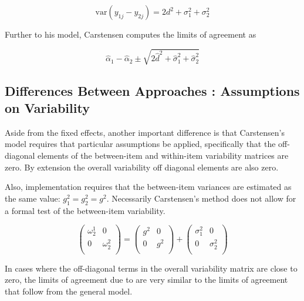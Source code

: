 \documentclass[12pt, a4paper]{report}
\theoremstyle{plain}
\theoremstyle{definition}
\theoremstyle{remark}
\begin{document}
	\[ \mbox{var}(y_{1j} - y_{2j}) = 2d^2 + \sigma^2_1 + \sigma^2_2  \]
	
	Further to his model, Carstensen computes the limits of agreement
	as
	
	\[
	\hat{\alpha}_1 - \hat{\alpha}_2 \pm \sqrt{2 \hat{d}^2 + 	\hat{\sigma}^2_1 + \hat{\sigma}^2_2}
	\]
	
	




	\subsection{Differences Between Approaches : Assumptions on Variability}
	Aside from the fixed effects, another important difference is that Carstensen's model requires that particular assumptions be applied, specifically that the off-diagonal elements of the between-item
	and within-item variability matrices are zero. By extension the
	overall variability off diagonal elements are also zero.
	
	Also, implementation requires that the between-item variances are
	estimated as the same value: $g^2_1 = g^2_2 = g^2$. Necessarily
	Carstensen's method does not allow for a formal test of the
	between-item variability.
	
	\[\left(\begin{array}{cc}
	\omega^1_2  & 0 \\
	0 & \omega^2_2 \\
	\end{array}  \right)
	=  \left(
	\begin{array}{cc}
	g^2  & 0 \\
	0 & g^2 \\
	\end{array} \right)+
	\left(
	\begin{array}{cc}
	\sigma^2_1  & 0 \\
	0 & \sigma^2_2 \\
	\end{array}\right)
	\]
	
	In cases where the off-diagonal terms in the overall variability
	matrix are close to zero, the limits of agreement due to
	\citet{BXC2008} are very similar to the limits of agreement that
	follow from the general model.
	
	
	
\end{document}
